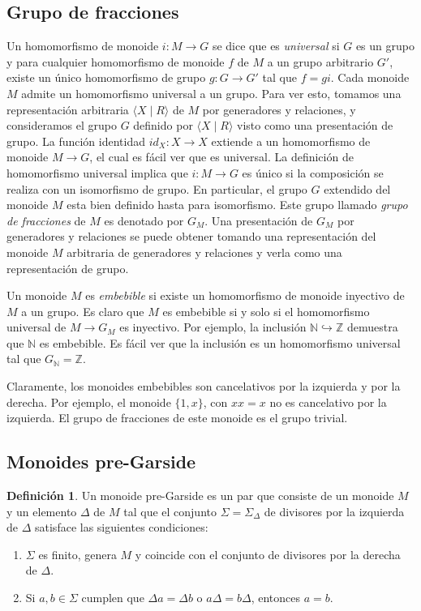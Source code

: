 \documentclass[12pt]{book}
\theoremstyle{definition}
\newtheorem{defi}{Definición}[section]
\begin{document}
\subsection{Grupo de fracciones}

Un homomorfismo de monoide $i:M\rightarrow G$ se dice que es \textit{universal} si $G$ es un grupo y para cualquier homomorfismo de monoide $f$ de $M$ a un grupo arbitrario $G'$, existe un único homomorfismo de grupo $g:G\rightarrow G'$ tal que $f=gi$. Cada monoide $M$ admite un homomorfismo universal a un grupo. Para ver esto, tomamos una representación arbitraria $\langle X \mid R \rangle$ de $M$ por generadores y relaciones, y consideramos el grupo $G$ definido por $\langle X \mid R \rangle$ visto como una presentación de grupo. La función identidad $id_X:X\rightarrow X$ extiende a un homomorfismo de monoide $M\rightarrow G$, el cual es fácil ver que es universal. La definición de homomorfismo universal implica que $i:M\rightarrow G$ es único si la composición se realiza con un isomorfismo de grupo. En particular, el grupo $G$ extendido del monoide $M$ esta bien definido hasta para isomorfismo. Este grupo llamado \textit{grupo de fracciones} de $M$ es denotado por $G_M$. Una presentación de $G_M$ por generadores y relaciones se puede obtener tomando una representación del monoide $M$ arbitraria de generadores y relaciones y verla como una representación de grupo.

Un monoide $M$ es \textit{embebible} si existe un homomorfismo de monoide inyectivo de $M$ a un grupo. Es claro que $M$ es embebible si y solo si el homomorfismo universal de $M\rightarrow G_M$ es inyectivo. Por ejemplo, la inclusión $\mathbb{N}\hookrightarrow\mathbb{Z}$ demuestra que $\mathbb{N}$ es embebible. Es fácil ver que la inclusión es un homomorfismo universal tal que $G_\mathbb{N}=\mathbb{Z}$.

Claramente, los monoides embebibles son cancelativos por la izquierda y por la derecha. Por ejemplo, el monoide $\{1,x\}$, con $xx=x$ no es cancelativo por la izquierda. El grupo de fracciones de este monoide es el grupo trivial.

\subsection{Monoides pre-Garside}

\begin{defi}
Un monoide pre-Garside es un par que consiste de un monoide $M$ y un elemento $\Delta$ de $M$ tal que el conjunto $\Sigma=\Sigma_\Delta$ de divisores por la izquierda de $\Delta$ satisface las siguientes condiciones:

\begin{enumerate}
\item $\Sigma$ es finito, genera $M$ y  coincide con el conjunto de divisores por la derecha de $\Delta$.
\item Si $a,b\in\Sigma$ cumplen que $\Delta a=\Delta b$ o $a\Delta=b\Delta$, entonces $a=b$.
\end{enumerate}
\label{defi:pre-garside}
\end{defi}
\end{document}
